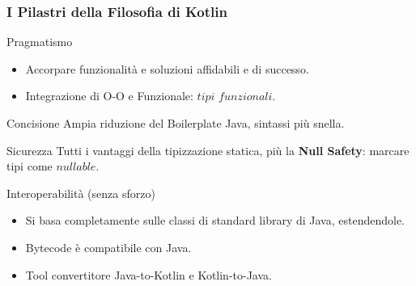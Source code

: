     \begin{frame}
      \frametitle{I Pilastri della Filosofia di Kotlin}
      \begin{block}{Pragmatismo}
        \begin{itemize}
          \item Accorpare funzionalità e soluzioni affidabili e di successo.
          \item Integrazione di O-O e Funzionale: $tipi$ $funzionali$.
        \end{itemize}
      \end{block}
      \begin{block}{Concisione}
        Ampia riduzione del Boilerplate Java, sintassi più snella.
      \end{block}
      \begin{block}{Sicurezza}
        Tutti i vantaggi della tipizzazione statica, più la \textbf{\alert{Null Safety}}: marcare tipi come $nullable$.
      \end{block}
      \begin{block}{Interoperabilità (senza sforzo)}
        \begin{itemize}
          \item Si basa completamente sulle classi di standard library di Java, estendendole.
          \item Bytecode è compatibile con Java.
          \item Tool convertitore Java-to-Kotlin e Kotlin-to-Java.
        \end{itemize}
      \end{block}
    \end{frame}

